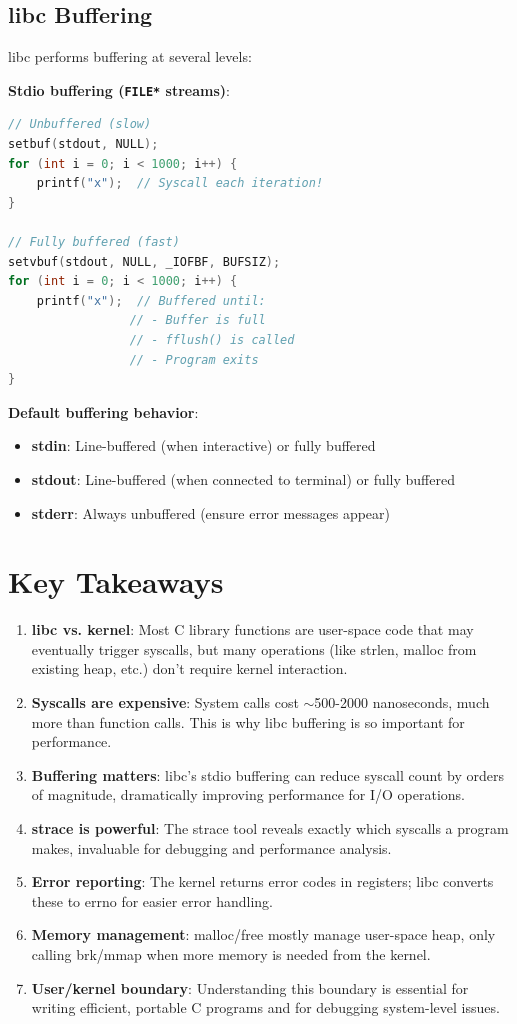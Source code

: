 \subsection{libc Buffering}

libc performs buffering at several levels:

\textbf{Stdio buffering (\texttt{FILE*} streams)}:
\begin{lstlisting}[language=C]
// Unbuffered (slow)
setbuf(stdout, NULL);
for (int i = 0; i < 1000; i++) {
    printf("x");  // Syscall each iteration!
}

// Fully buffered (fast)
setvbuf(stdout, NULL, _IOFBF, BUFSIZ);
for (int i = 0; i < 1000; i++) {
    printf("x");  // Buffered until:
                 // - Buffer is full
                 // - fflush() is called
                 // - Program exits
}
\end{lstlisting}

\textbf{Default buffering behavior}:
\begin{itemize}
    \item \textbf{stdin}: Line-buffered (when interactive) or fully buffered
    \item \textbf{stdout}: Line-buffered (when connected to terminal) or fully buffered
    \item \textbf{stderr}: Always unbuffered (ensure error messages appear)
\end{itemize}

\section{Key Takeaways}

\begin{enumerate}
    \item \textbf{libc vs. kernel}: Most C library functions are user-space code that may eventually trigger syscalls, but many operations (like strlen, malloc from existing heap, etc.) don't require kernel interaction.
    \item \textbf{Syscalls are expensive}: System calls cost $\sim$500-2000 nanoseconds, much more than function calls. This is why libc buffering is so important for performance.
    \item \textbf{Buffering matters}: libc's stdio buffering can reduce syscall count by orders of magnitude, dramatically improving performance for I/O operations.
    \item \textbf{strace is powerful}: The strace tool reveals exactly which syscalls a program makes, invaluable for debugging and performance analysis.
    \item \textbf{Error reporting}: The kernel returns error codes in registers; libc converts these to errno for easier error handling.
    \item \textbf{Memory management}: malloc/free mostly manage user-space heap, only calling brk/mmap when more memory is needed from the kernel.
    \item \textbf{User/kernel boundary}: Understanding this boundary is essential for writing efficient, portable C programs and for debugging system-level issues.
\end{enumerate}

